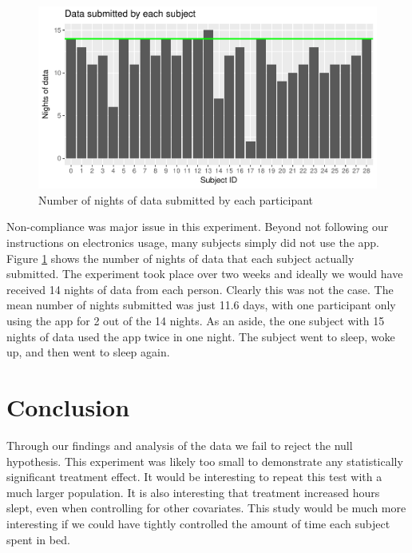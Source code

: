 \documentclass[12pt,]{article}
\begin{document}
\begin{figure}
\centering
\includegraphics{report_files/figure-latex/days_used-1.pdf}
\caption{\label{fig:days_used} Number of nights of data submitted by
each participant}
\end{figure}

Non-compliance was major issue in this experiment. Beyond not following
our instructions on electronics usage, many subjects simply did not use
the app. Figure \ref{fig:days_used} shows the number of nights of data
that each subject actually submitted. The experiment took place over two
weeks and ideally we would have received 14 nights of data from each
person. Clearly this was not the case. The mean number of nights
submitted was just 11.6 days, with one participant only using the app
for 2 out of the 14 nights. As an aside, the one subject with 15 nights
of data used the app twice in one night. The subject went to sleep, woke
up, and then went to sleep again.

\hypertarget{conclusion}{%
\section{Conclusion}\label{conclusion}}

Through our findings and analysis of the data we fail to reject the null
hypothesis. This experiment was likely too small to demonstrate any
statistically significant treatment effect. It would be interesting to
repeat this test with a much larger population. It is also interesting
that treatment increased hours slept, even when controlling for other
covariates. This study would be much more interesting if we could have
tightly controlled the amount of time each subject spent in bed.
\end{document}

